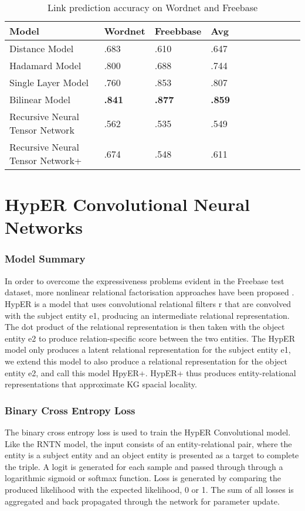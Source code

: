 \begin{table}[H]
	\caption{Link prediction accuracy on Wordnet and Freebase}
	\centering
	\begin{tabular}{lllllllllll}
  		\textbf{Model} & \textbf{Wordnet} & \textbf{Freebbase} & \textbf{Avg} \\
  		\hline
  		Distance Model & .683 & .610 & .647 \\
  		Hadamard Model & .800 & .688 & .744 \\
  		Single Layer Model & .760 & .853 & .807 \\
  		Bilinear Model & \textbf{.841} & \textbf{.877} & \textbf{.859} \\
  		Recursive Neural Tensor Network & .562 & .535 & .549 \\
  		\hline
  		Recursive Neural Tensor Network+ & .674 & .548 & .611 \\
	\end{tabular}
\end{table}

\section{HypER Convolutional Neural Networks}

\subsubsection{Model Summary} 
In order to overcome the expressiveness problems evident in the Freebase test dataset, more nonlinear relational factorisation approaches have been proposed \cite{ComplEx, Neural LP, TorusE}. \newline
HypER is a model that uses convolutional relational filters r that are convolved with the subject entity e1, producing an intermediate relational representation. The dot product of the relational representation is then taken with the object entity e2 to produce relation-specific score between the two entities. The HypER model only produces a latent relational representation for the subject entity e1, we extend this model to also produce a relational representation for the object entity e2, and call this model HpyER+. HypER+ thus produces entity-relational representations that approximate KG spacial locality. \newline
\subsubsection{Binary Cross Entropy Loss}
The binary cross entropy loss \cite{reference} is used to train the HypER Convolutional model. Like the RNTN model, the input consists of an entity-relational pair, where the entity is a subject entity and an object entity is presented as a target to complete the triple. A logit is generated for each sample and passed through through a logarithmic sigmoid or softmax function. Loss is generated by comparing the produced likelihood with the expected likelihood, 0 or 1. The sum of all losses is aggregated and back propagated through the network for parameter update. \newline

